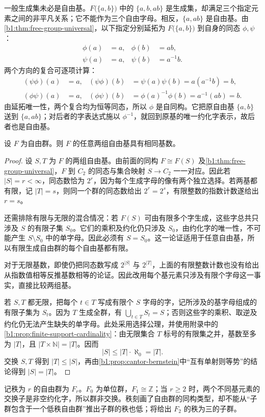 \ProseParagraphBreak
一般生成集未必是自由基。\(F\bigl(\{a,b\}\bigr)\) 中的 \(\{a,b,ab\}\) 是生成集，却满足三个指定元素之间的非平凡关系；它不能作为三个自由字母。相反，\(\{a,ab\}\) 是自由基。由\cref{b1:thm:free-group-universal}，以下指定分别延拓为 \(F\bigl(\{a,b\}\bigr)\) 到自身的同态 \(\phi,\psi\)：
\[
	\begin{aligned}
		\phi(a)&=a,&\phi(b)&=ab,\\
		\psi(a)&=a,&\psi(b)&=a^{-1}b.
	\end{aligned}
\]
两个方向的复合可逐项计算：
\[
	\begin{aligned}
		(\psi\phi)(a)&=a,& (\psi\phi)(b)&=\psi(a)\psi(b)=a(a^{-1}b)=b,\\
		(\phi\psi)(a)&=a,& (\phi\psi)(b)&=\phi(a)^{-1}\phi(b)=a^{-1}(ab)=b.
	\end{aligned}
\]
由延拓唯一性，两个复合均为恒等同态，所以 \(\phi\) 是自同构。它把原自由基 \(\{a,b\}\) 送到 \(\{a,ab\}\)；对后者的字表达式施以 \(\phi^{-1}\)，就回到原基的唯一约化字表示，故后者也是自由基。

\begin{proposition}\label{b1:prop:free-rank-invariant}
	设 \(F\) 为自由群。则 \(F\) 的任意两组自由基具有相同基数。
\end{proposition}
\begin{proof}
	设 \(S,T\) 为 \(F\) 的两组自由基。由前面的同构 \(F\cong F(S)\) 及\cref{b1:thm:free-group-universal}，\(F\) 到 \(C_2\) 的同态与集合映射 \(S\to C_2\) 一一对应。因此若 \(|S|=r<\infty\)，同态数恰为 \(2^r\)，因为每个生成字母的像有两个独立选择。若两基都有限，记 \(|T|=s\)，则同一个群的同态数给出 \(2^r=2^s\)，有限整数的指数计数遂给出 \(r=s\)。

	还需排除有限与无限的混合情况：若 \(F(S)\) 可由有限多个字生成，这些字总共只涉及 \(S\) 的有限子集 \(S_0\)。它们的乘积及约化仍只涉及 \(S_0\)，由约化字的唯一性，不可能产生 \(S\setminus S_0\) 中的单字母。因此必须有 \(S=S_0\)。这一论证适用于任意自由基，所以有限生成自由群的每个自由基都有限。

	对于无限基数，即使仍把同态数写成 \(2^{|S|}\) 与 \(2^{|T|}\)，上面的有限整数计数也没有给出从指数值相等反推基数相等的论证。因此改用每个基元素只涉及有限个字母这一事实，直接比较两组基。

	若 \(S,T\) 都无限，把每个 \(t\in T\) 写成有限个 \(S\) 字母的字，记所涉及的基字母组成的有限子集为 \(S_t\)。因为 \(T\) 生成全群，有 \(\bigcup_{t\in T}S_t=S\)；否则这些字的乘积、取逆及约化仍无法产生缺失的单字母。此处采用选择公理，并使用附录中的\cref{b1:prop:finite-support-cardinality}：由无限集合 \(T\) 标号的有限集之并，基数至多为 \(|T|\)，且 \(|T\times\mathbb N|=|T|\)。因而
	\[
		|S|\le |T|\cdot\aleph_0=|T|.
	\]
	交换 \(S,T\) 得到 \(|T|\le|S|\)，再由\cref{b1:prop:cantor-bernstein}中“互有单射则等势”的结论得到 \(|S|=|T|\)。
\end{proof}

记秩为 \(r\) 的自由群为 \(F_r\)。\(F_0\) 为单位群，\(F_1\cong\mathbb Z\)；当 \(r\ge2\) 时，两个不同基元素的交换子是非空约化字，所以群非交换。秩刻画了自由群的同构类型，却不能从“子群包含于一个低秩自由群”推出子群的秩也低；将给出 \(F_2\) 的秩为三的子群。
